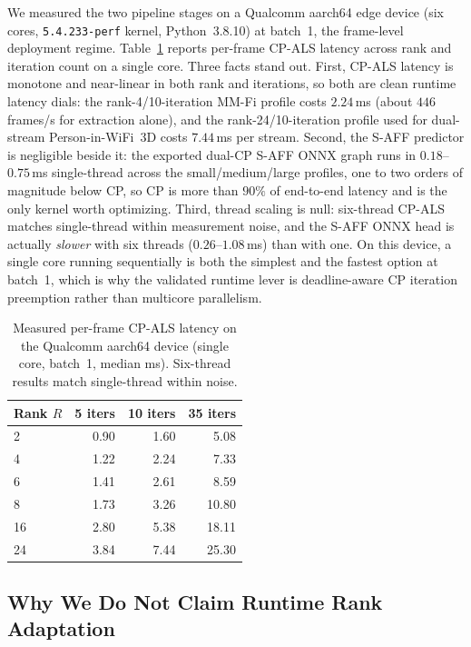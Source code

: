 \documentclass[10pt,conference]{IEEEtran}
\begin{document}
We measured the two pipeline stages on a Qualcomm aarch64 edge device (six cores, \texttt{5.4.233-perf} kernel, Python~3.8.10) at batch~1, the frame-level deployment regime. Table~\ref{tab:ondevice} reports per-frame CP-ALS latency across rank and iteration count on a single core. Three facts stand out. First, CP-ALS latency is monotone and near-linear in both rank and iterations, so both are clean runtime latency dials: the rank-4/10-iteration MM-Fi profile costs $2.24$\,ms (about $446$ frames/s for extraction alone), and the rank-24/10-iteration profile used for dual-stream Person-in-WiFi~3D costs $7.44$\,ms per stream. Second, the S-AFF predictor is negligible beside it: the exported dual-CP S-AFF ONNX graph runs in $0.18$--$0.75$\,ms single-thread across the small/medium/large profiles, one to two orders of magnitude below CP, so CP is more than $90\%$ of end-to-end latency and is the only kernel worth optimizing. Third, thread scaling is null: six-thread CP-ALS matches single-thread within measurement noise, and the S-AFF ONNX head is actually \emph{slower} with six threads ($0.26$--$1.08$\,ms) than with one. On this device, a single core running sequentially is both the simplest and the fastest option at batch~1, which is why the validated runtime lever is deadline-aware CP iteration preemption rather than multicore parallelism.

\begin{table}[t]
\centering
\caption{Measured per-frame CP-ALS latency on the Qualcomm aarch64 device (single core, batch~1, median ms). Six-thread results match single-thread within noise.}
\label{tab:ondevice}
\begin{tabular}{lrrr}
\toprule
Rank $R$ & 5 iters & 10 iters & 35 iters \\
\midrule
2  & 0.90 & 1.60 & 5.08 \\
4  & 1.22 & 2.24 & 7.33 \\
6  & 1.41 & 2.61 & 8.59 \\
8  & 1.73 & 3.26 & 10.80 \\
16 & 2.80 & 5.38 & 18.11 \\
24 & 3.84 & 7.44 & 25.30 \\
\bottomrule
\end{tabular}
\end{table}

\subsection{Why We Do Not Claim Runtime Rank Adaptation}
\label{sec:rank_negative}
\end{document}
